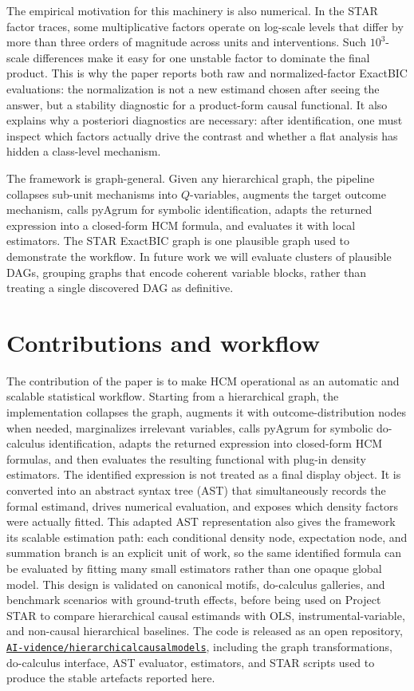 \documentclass[unnumsec,webpdf,contemporary,large]{oup-authoring-template}%
\theoremstyle{thmstyleone}%
\theoremstyle{thmstyletwo}%
\theoremstyle{thmstylethree}%
\begin{document}
The empirical motivation for this machinery is also numerical.
In the STAR factor traces, some multiplicative factors operate on log-scale levels that differ by more than three orders of magnitude across units and interventions.
Such $10^3$-scale differences make it easy for one unstable factor to dominate the final product.
This is why the paper reports both raw and normalized-factor ExactBIC evaluations: the normalization is not a new estimand chosen after seeing the answer, but a stability diagnostic for a product-form causal functional.
It also explains why a posteriori diagnostics are necessary: after identification, one must inspect which factors actually drive the contrast and whether a flat analysis has hidden a class-level mechanism.

The framework is graph-general.
Given any hierarchical graph, the pipeline collapses sub-unit mechanisms into $Q$-variables, augments the target outcome mechanism, calls pyAgrum for symbolic identification, adapts the returned expression into a closed-form HCM formula, and evaluates it with local estimators.
The STAR ExactBIC graph is one plausible graph used to demonstrate the workflow.
In future work we will evaluate clusters of plausible DAGs, grouping graphs that encode coherent variable blocks, rather than treating a single discovered DAG as definitive.

\section{Contributions and workflow}
\label{sec:contributions}

The contribution of the paper is to make HCM operational as an automatic and scalable statistical workflow.
Starting from a hierarchical graph, the implementation collapses the graph, augments it with outcome-distribution nodes when needed, marginalizes irrelevant variables, calls pyAgrum for symbolic do-calculus identification, adapts the returned expression into closed-form HCM formulas, and then evaluates the resulting functional with plug-in density estimators.
The identified expression is not treated as a final display object.
It is converted into an abstract syntax tree (AST) that simultaneously records the formal estimand, drives numerical evaluation, and exposes which density factors were actually fitted.
This adapted AST representation also gives the framework its scalable estimation path: each conditional density node, expectation node, and summation branch is an explicit unit of work, so the same identified formula can be evaluated by fitting many small estimators rather than one opaque global model.
This design is validated on canonical motifs, do-calculus galleries, and benchmark scenarios with ground-truth effects, before being used on Project STAR to compare hierarchical causal estimands with OLS, instrumental-variable, and non-causal hierarchical baselines.
The code is released as an open repository, \href{https://github.com/AI-vidence/hierarchicalcausalmodels}{\texttt{AI-vidence/hierarchicalcausalmodels}}, including the graph transformations, do-calculus interface, AST evaluator, estimators, and STAR scripts used to produce the stable artefacts reported here.
\end{document}
